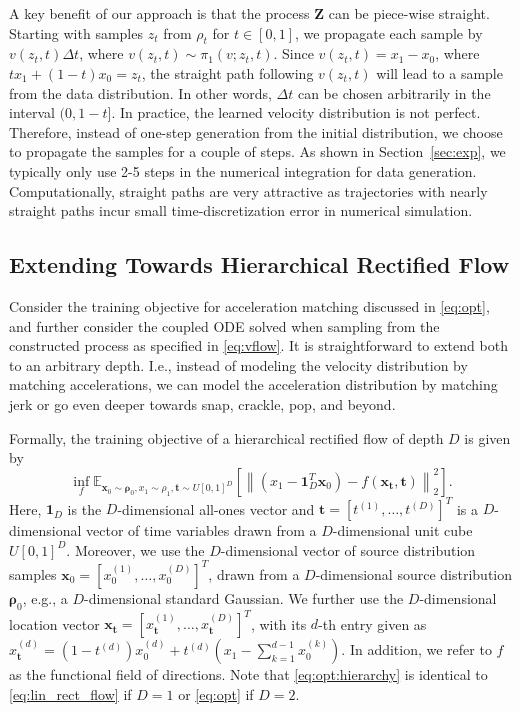 A key benefit of our approach is that the process $\bm{Z}$ can be piece-wise straight. Starting with samples $z_t$ from $\rho_t$ for $t \in [0, 1]$, we propagate  each sample by $v(z_t, t)\Delta t$, where $v(z_t, t)\sim  \pi_1(v; z_t, t)$. Since $v(z_t, t) = x_1 - x_0$, where $tx_1 + (1-t) x_0 = z_t$, the straight path following $v(z_t, t)$ will lead to a sample from the data distribution. In other words, $\Delta t$ can be chosen arbitrarily in the interval $(0, 1-t]$.  In practice, the learned velocity distribution is not perfect. Therefore, instead of one-step generation from the initial distribution, we choose to propagate the samples for a couple of steps. As shown in Section~\ref{sec:exp}, we typically only use 2-5 steps in the numerical integration for data generation. Computationally, straight paths are very attractive as trajectories with nearly straight paths incur small time-discretization error in numerical simulation.

 




\subsection{Extending Towards Hierarchical Rectified Flow}
\label{sec:method:extension}

Consider the training objective for acceleration matching discussed in \cref{eq:opt}, and further consider the coupled ODE solved when sampling from the constructed process as specified in \cref{eq:vflow}. It is straightforward to extend both to an arbitrary depth. I.e., instead of modeling the velocity distribution by matching accelerations, we can model the acceleration distribution by matching jerk or go even deeper towards snap, crackle, pop, and beyond.

Formally, the training objective of a hierarchical rectified flow of depth $D$ is given by
\begin{equation}
\label{eq:opt:hierarchy}
\inf_f \mathbb{E}_{{\bm x}_0\sim{\bm \rho}_0,x_1\sim\rho_1,{\bm t}\sim U[0,1]^D}\left[\left\|\left(x_1 - {\bm 1}_D^T{\bm x}_0\right) - f\left({\bm x}_{\bm t},{\bm t}\right)\right\|^2_2\right].
\end{equation}
Here, ${\bm 1}_D$ is the $D$-dimensional all-ones vector and ${\bm t} = \left[t^{(1)}, \dots, t^{(D)}\right]^T$ is a $D$-dimensional vector of time variables drawn from a $D$-dimensional unit cube $U[0,1]^D$. Moreover, we use the $D$-dimensional vector of source distribution samples ${\bm x}_0 = [x_0^{(1)}, \dots, x_0^{(D)}]^T$, drawn from a $D$-dimensional source distribution ${\bm \rho}_0$, e.g., a $D$-dimensional standard Gaussian. We further use the $D$-dimensional location vector ${\bm x}_{\bm t} = [x^{(1)}_{\bm t}, \dots, x^{(D)}_{\bm t}]^T$, with its $d$-th entry given as $x^{(d)}_{\bm t} = (1-t^{(d)})x_0^{(d)} + t^{(d)}(x_1 - \sum_{k=1}^{d-1} x_0^{(k)})$. In addition, we refer to $f$ as the functional field of directions. Note that \cref{eq:opt:hierarchy} is identical to \cref{eq:lin_rect_flow} if $D=1$ or \cref{eq:opt} if $D=2$.

